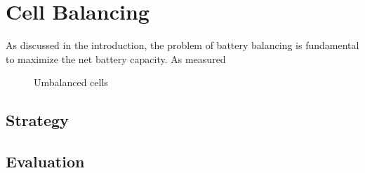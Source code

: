 \chapter{Cell Balancing}
\label{cha:balancing}
As discussed in the introduction, the problem of battery balancing is fundamental to maximize the net battery capacity. As measured


\begin{figure}[h]
    \centering
    
    \caption{Umbalanced cells}
    \label{fig:imbalance}
\end{figure}

\section{Strategy}

\section{Evaluation}
